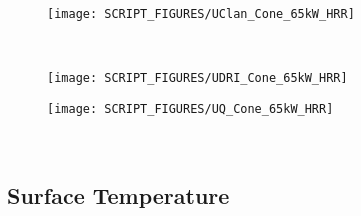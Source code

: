 \begin{minipage}{0.35\textwidth}
\begin{figure}[H]
{\texttt{[image: SCRIPT\_FIGURES/UClan\_Cone\_65kW\_HRR]}}\\
\end{figure}
\end{minipage}\\
\begin{minipage}{0.5\textwidth}
\begin{figure}[H]
{\texttt{[image: SCRIPT\_FIGURES/UDRI\_Cone\_65kW\_HRR]}}\\
\end{figure}
\end{minipage}
\begin{minipage}{0.35\textwidth}
\begin{figure}[H]
{\texttt{[image: SCRIPT\_FIGURES/UQ\_Cone\_65kW\_HRR]}}\\
\end{figure}
\end{minipage}\\
\vfill 

\newpage
\subsection{Surface Temperature}
\label{Cone_Temp}
